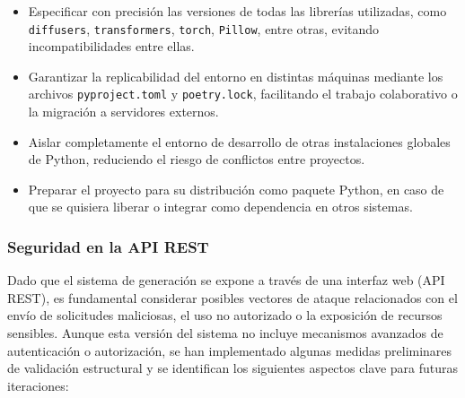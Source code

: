 \begin{itemize}
    \item Especificar con precisión las versiones de todas las librerías utilizadas, como \texttt{diffusers}, \texttt{transformers}, \texttt{torch}, \texttt{Pillow}, entre otras, evitando incompatibilidades entre ellas.
    \item Garantizar la replicabilidad del entorno en distintas máquinas mediante los archivos \texttt{pyproject.toml} y \texttt{poetry.lock}, facilitando el trabajo colaborativo o la migración a servidores externos.
    \item Aislar completamente el entorno de desarrollo de otras instalaciones globales de Python, reduciendo el riesgo de conflictos entre proyectos.
    \item Preparar el proyecto para su distribución como paquete Python, en caso de que se quisiera liberar o integrar como dependencia en otros sistemas.
\end{itemize}

\subsubsection{Seguridad en la API REST}

Dado que el sistema de generación se expone a través de una interfaz web (API REST), es fundamental considerar posibles vectores de ataque relacionados con el envío de solicitudes maliciosas, el uso no autorizado o la exposición de recursos sensibles. Aunque esta versión del sistema no incluye mecanismos avanzados de autenticación o autorización, se han implementado algunas medidas preliminares de validación estructural y se identifican los siguientes aspectos clave para futuras iteraciones:

